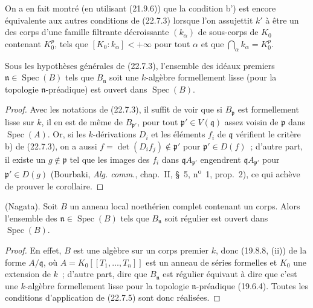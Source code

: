 
\begin{remark}[22.7.4]
\label{0.22.7.4-fr}
On a en fait montré (en utilisant (21.9.6)) que la condition b') est encore
équivalente aux autres conditions de (22.7.3) lorsque l'on assujettit $k'$ à
être un des corps d'une famille filtrante décroissante $(k_\alpha)$ de
sous-corps de $K_0$ contenant $K_0^p$, tels que
$[K_0:k_\alpha]<+\infty$ pour tout $\alpha$ et que
$\bigcap_\alpha k_\alpha=K_0^p$.
\end{remark}

\begin{corollary}[22.7.5]
\label{0.22.7.5-fr}
Sous les hypothèses générales de (22.7.3), l'ensemble des idéaux premiers
$\mathfrak n\in\operatorname{Spec}(B)$ tels que $B_{\mathfrak n}$ soit une
$k$-algèbre formellement lisse (pour la topologie $\mathfrak n$-préadique)
est ouvert dans $\operatorname{Spec}(B)$.
\end{corollary}

\begin{proof}
Avec les notations de (22.7.3), il suffit de voir que si $B_{\mathfrak p}$
est formellement lisse sur $k$, il en est de même de $B_{\mathfrak p'}$, pour
tout $\mathfrak p'\in V(\mathfrak q)$ assez voisin de $\mathfrak p$ dans
$\operatorname{Spec}(A)$. Or, si les $k$-dérivations $D_i$ et les éléments
$f_i$ de $\mathfrak q$ vérifient le critère b) de (22.7.3), on a aussi
$f=\det(D_if_j)\notin\mathfrak p'$ pour $\mathfrak p'\in D(f)$~; d'autre
part, il existe un $g\notin\mathfrak p$ tel que les images des $f_i$ dans
$\mathfrak qA_{\mathfrak p'}$ engendrent $\mathfrak qA_{\mathfrak p'}$ pour
$\mathfrak p'\in D(g)$ (Bourbaki, \emph{Alg. comm.}, chap.~II, §~5,
n\textsuperscript{o}~1, prop.~2), ce qui achève de prouver le corollaire.
\end{proof}

\begin{corollary}[22.7.6]
\label{0.22.7.6-fr}
\textnormal{(Nagata).} Soit $B$ un anneau local noethérien complet contenant
un corps. Alors l'ensemble des $\mathfrak n\in\operatorname{Spec}(B)$ tels
que $B_{\mathfrak n}$ soit régulier est ouvert dans $\operatorname{Spec}(B)$.
\end{corollary}

\begin{proof}
En effet, $B$ est une algèbre sur un corps premier $k$, donc (19.8.8, (ii))
de la forme $A/\mathfrak q$, où
$A=K_0[[T_1,\ldots,T_n]]$ est un anneau de séries formelles et $K_0$ une
extension de $k$~; d'autre part, dire que $B_{\mathfrak n}$ est régulier
équivaut à dire que c'est une $k$-algèbre formellement lisse pour la topologie
$\mathfrak n$-préadique (19.6.4). Toutes les conditions d'application de
(22.7.5) sont donc réalisées.
\end{proof}

